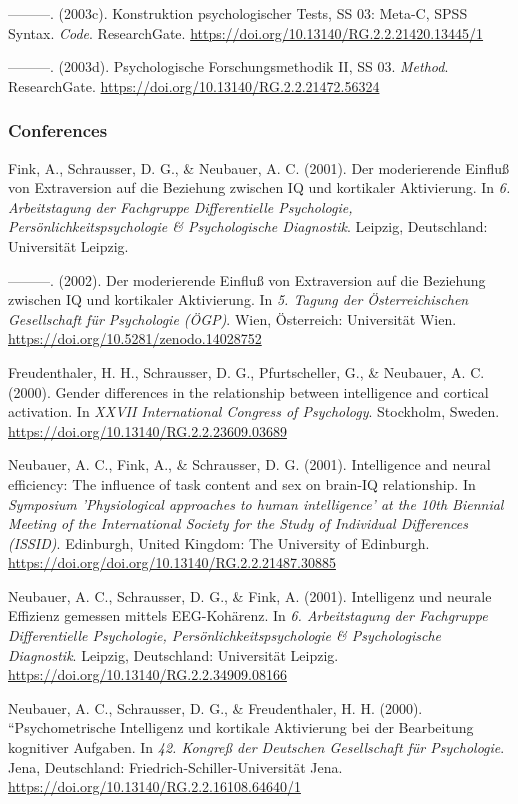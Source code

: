 \documentclass[
]{article}
\begin{document}
---------. (2003c). Konstruktion psychologischer Tests, SS 03: Meta-C,
SPSS Syntax. \emph{Code}. ResearchGate.
\url{https://doi.org/10.13140/RG.2.2.21420.13445/1}

---------. (2003d). Psychologische Forschungsmethodik II, SS 03.
\emph{Method}. ResearchGate.
\url{https://doi.org/10.13140/RG.2.2.21472.56324}

\hypertarget{conferences}{%
\subsubsection{Conferences}\label{conferences}}

Fink, A., Schrausser, D. G., \& Neubauer, A. C. (2001). Der moderierende
Einfluß von Extraversion auf die Beziehung zwischen IQ und kortikaler
Aktivierung. In \emph{6. Arbeitstagung der Fachgruppe Differentielle
Psychologie, Persönlichkeitspsychologie \& Psychologische Diagnostik}.
Leipzig, Deutschland: Universität Leipzig.

---------. (2002). Der moderierende Einfluß von Extraversion auf die
Beziehung zwischen IQ und kortikaler Aktivierung. In \emph{5. Tagung der
Österreichischen Gesellschaft für Psychologie (ÖGP)}. Wien, Österreich:
Universität Wien. \url{https://doi.org/10.5281/zenodo.14028752}

Freudenthaler, H. H., Schrausser, D. G., Pfurtscheller, G., \& Neubauer,
A. C. (2000). Gender differences in the relationship between
intelligence and cortical activation. In \emph{XXVII International
Congress of Psychology}. Stockholm, Sweden.
\url{https://doi.org/10.13140/RG.2.2.23609.03689}

Neubauer, A. C., Fink, A., \& Schrausser, D. G. (2001). Intelligence and
neural efficiency: The influence of task content and sex on brain-IQ
relationship. In \emph{Symposium 'Physiological approaches to human
intelligence' at the 10th Biennial Meeting of the International Society
for the Study of Individual Differences (ISSID)}. Edinburgh, United
Kingdom: The University of Edinburgh.
\url{https://doi.org/doi.org/10.13140/RG.2.2.21487.30885}

Neubauer, A. C., Schrausser, D. G., \& Fink, A. (2001). Intelligenz und
neurale Effizienz gemessen mittels EEG-Kohärenz. In \emph{6.
Arbeitstagung der Fachgruppe Differentielle Psychologie,
Persönlichkeitspsychologie \& Psychologische Diagnostik}. Leipzig,
Deutschland: Universität Leipzig.
\url{https://doi.org/10.13140/RG.2.2.34909.08166}

Neubauer, A. C., Schrausser, D. G., \& Freudenthaler, H. H. (2000).
``Psychometrische Intelligenz und kortikale Aktivierung bei der
Bearbeitung kognitiver Aufgaben. In \emph{42. Kongreß der Deutschen
Gesellschaft für Psychologie}. Jena, Deutschland:
Friedrich-Schiller-Universität Jena.
\url{https://doi.org/10.13140/RG.2.2.16108.64640/1}
\end{document}

